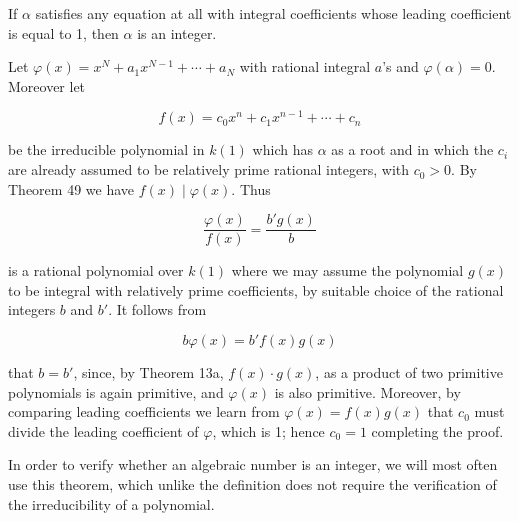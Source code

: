 If $\alpha$ satisfies any equation at all with integral coefficients whose leading coefficient is equal to 1, then $\alpha$ is an integer.

Let $\varphi(x) = x^N + a_1 x^{N-1} + \cdots + a_N$ with rational integral $a$'s and $\varphi(\alpha) = 0$. Moreover let

$$f(x) = c_0 x^n + c_1 x^{n-1} + \cdots + c_n$$

be the irreducible polynomial in $k(1)$ which has $\alpha$ as a root and in which the $c_i$ are already assumed to be relatively prime rational integers, with $c_0 > 0$. By Theorem 49 we have $f(x) \mid \varphi(x)$. Thus

$$\frac{\varphi(x)}{f(x)} = \frac{b' g(x)}{b}$$

is a rational polynomial over $k(1)$ where we may assume the polynomial $g(x)$ to be integral with relatively prime coefficients, by suitable choice of the rational integers $b$ and $b'$. It follows from

$$b \varphi(x) = b' f(x) g(x)$$

that $b = b'$, since, by Theorem 13a, $f(x) \cdot g(x)$, as a product of two primitive polynomials is again primitive, and $\varphi(x)$ is also primitive. Moreover, by comparing leading coefficients we learn from $\varphi(x) = f(x) g(x)$ that $c_0$ must divide the leading coefficient of $\varphi$, which is 1; hence $c_0 = 1$ completing the proof.

In order to verify whether an algebraic number is an integer, we will most often use this theorem, which unlike the definition does not require the verification of the irreducibility of a polynomial.
